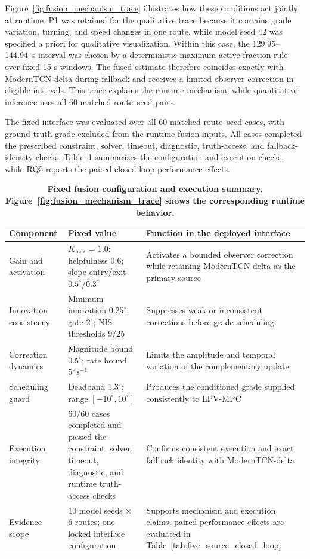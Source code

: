 \documentclass{ieeeaccess}
\begin{document}
Figure~\ref{fig:fusion_mechanism_trace} illustrates how these conditions act
jointly at runtime. P1 was retained for the qualitative trace because it
contains grade variation, turning, and speed changes in one route, while model
seed 42 was specified a priori for qualitative visualization. Within this
case, the 129.95--144.94~s interval was chosen by a deterministic
maximum-active-fraction rule over fixed 15-s windows. The fused estimate
therefore coincides exactly with ModernTCN-delta during fallback and receives a
limited observer correction in eligible intervals. This trace explains the
runtime mechanism, while quantitative inference uses all 60 matched
route--seed pairs.

The fixed interface was evaluated over all 60 matched route--seed cases, with
ground-truth grade excluded from the runtime fusion inputs. All cases completed
the prescribed constraint, solver, timeout, diagnostic, truth-access, and
fallback-identity checks. Table~\ref{tab:observer_fusion_evidence} summarizes
the configuration and execution checks, while RQ5 reports the paired
closed-loop performance effects.

\begin{table}[!tbp]
\centering
\caption{\textbf{Fixed fusion configuration and execution summary. Figure~\ref{fig:fusion_mechanism_trace} shows the corresponding runtime behavior.}}
\label{tab:observer_fusion_evidence}
\scriptsize
\setlength{\tabcolsep}{3.2pt}
\begin{tabular}{|p{}|p{}|p{}|}
\hline
Component & Fixed value & Function in the deployed interface \\
\hline
Gain and activation
& $K_{\max}=1.0$; helpfulness 0.6; slope entry/exit $0.5^{\circ}/0.3^{\circ}$
& Activates a bounded observer correction while retaining ModernTCN-delta as the primary source \\
Innovation consistency
& Minimum innovation $0.25^{\circ}$; gate $2^{\circ}$; NIS thresholds 9/25
& Suppresses weak or inconsistent corrections before grade scheduling \\
Correction dynamics
& Magnitude bound $0.5^{\circ}$; rate bound $5^{\circ}\,\mathrm{s}^{-1}$
& Limits the amplitude and temporal variation of the complementary update \\
Scheduling guard
& Deadband $1.3^{\circ}$; range $[-10^{\circ},10^{\circ}]$
& Produces the conditioned grade supplied consistently to LPV-MPC \\
Execution integrity
& 60/60 cases completed and passed the constraint, solver, timeout, diagnostic, and runtime truth-access checks
& Confirms consistent execution and exact fallback identity with ModernTCN-delta \\
Evidence scope
& 10 model seeds $\times$ 6 routes; one locked interface configuration
& Supports mechanism and execution claims; paired performance effects are evaluated in Table~\ref{tab:five_source_closed_loop} \\
\hline
\end{tabular}
\end{table}
\end{document}

